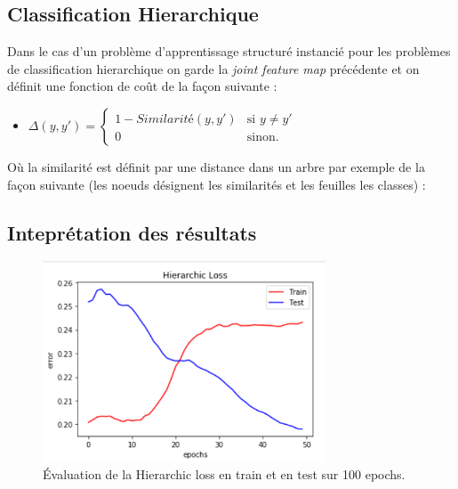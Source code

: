 \documentclass[a4paper]{article}
\begin{document}
\subsection{Classification Hierarchique}
Dans le cas d'un problème d'apprentissage structuré instancié pour les problèmes de classification hierarchique on garde la \textit{joint feature map} précédente et on définit une fonction de coût de la façon suivante : 
\begin{itemize}   
\item $\Delta(y,y') = \left\{
    \begin{array}{ll}
        1 - \textit{Similarité}(y,y') & \mbox{si } y \neq y' \\
        0 & \mbox{sinon.}
    \end{array}
\right.$
\end{itemize}
Où la similarité est définit par une distance dans un arbre par exemple de la façon suivante (les noeuds désignent les similarités et les feuilles les classes) :

\subsection{Inteprétation des résultats}

\begin{figure}
\centering
\includegraphics[width=0.75\textwidth]{HierLoss.png}
\caption{\label{fig:data} Évaluation de la Hierarchic loss en train et en test sur 100 epochs.}
\end{figure}
\end{document}

